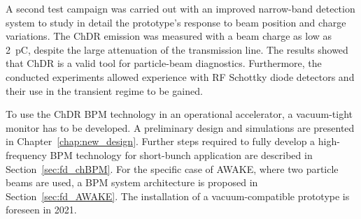 A second test campaign was carried out with an improved narrow-band detection system to study in detail the prototype's response to beam position and charge variations. The ChDR emission was measured with a beam charge as low as 2~pC, despite the large attenuation of the transmission line. The results showed that ChDR is a valid tool for particle-beam diagnostics. Furthermore, the conducted experiments allowed experience with RF Schottky diode detectors and their use in the transient regime to be gained. 

To use the ChDR BPM technology in an operational accelerator, a vacuum-tight monitor has to be developed. A preliminary design and simulations are presented in Chapter~\ref{chap:new_design}. Further steps required to fully develop a high-frequency BPM technology for short-bunch application are described in Section~\ref{sec:fd_chBPM}. For the specific case of AWAKE, where two particle beams are used, a BPM system architecture is proposed in Section~\ref{sec:fd_AWAKE}. The installation of a vacuum-compatible prototype is foreseen in 2021. 


